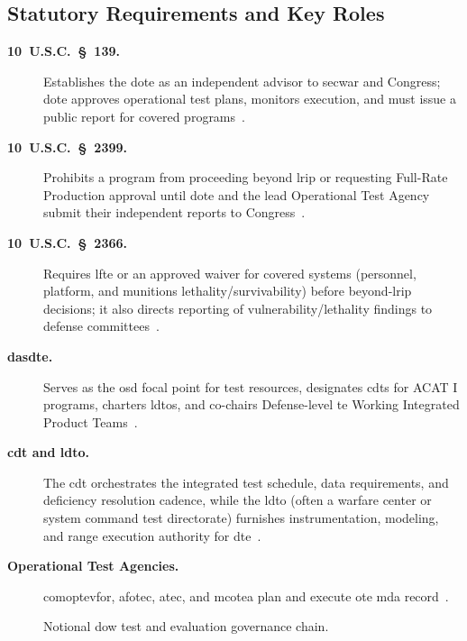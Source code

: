 \documentclass[../main.tex]{subfiles}
\begin{document}
\subsection{Statutory Requirements and Key Roles}
\begin{description}
	\item[\textbf{10~U.S.C.~\S~139.}] Establishes the \ac{dote} as an independent advisor to \ac{secwar} and Congress; \ac{dote} approves operational test plans, monitors execution, and must issue a public report for covered programs~\autocite{USC-10-139}.
	\item[\textbf{10~U.S.C.~\S~2399.}] Prohibits a program from proceeding beyond \ac{lrip} or requesting Full-Rate Production approval until \ac{dote} and the lead Operational Test Agency submit their independent reports to Congress~\autocite{USC-10-2399}.
	\item[\textbf{10~U.S.C.~\S~2366.}] Requires \ac{lfte} or an approved waiver for covered systems (personnel, platform, and munitions lethality/survivability) before beyond-\ac{lrip} decisions; it also directs reporting of vulnerability/lethality findings to defense committees~\autocite{USC-10-2366}.
	\item[\textbf{\ac{dasdte}.}] Serves as the \ac{osd} focal point for test resources, designates \acp{cdt} for ACAT I programs, charters \acp{ldto}, and co-chairs Defense-level \ac{te} Working Integrated Product Teams~\autocite{DoDI5000-89}.
	\item[\textbf{\ac{cdt} and \ac{ldto}.}] The \ac{cdt} orchestrates the integrated test schedule, data requirements, and deficiency resolution cadence, while the \ac{ldto} (often a warfare center or system command test directorate) furnishes instrumentation, modeling, and range execution authority for \ac{dte}~\autocite{DoDI5000-89}.
	\item[\textbf{Operational Test Agencies.}] \ac{comoptevfor}, \ac{afotec}, \ac{atec}, and \ac{mcotea} plan and execute \ac{ote} \ac{mda} record~\autocite{edo-3-5-6-test-eval-part-ii-2025}.
\end{description}

\begin{figure}
	\centering
	\caption{Notional \ac{dow} test and evaluation governance chain.}
\end{figure}
\end{document}
